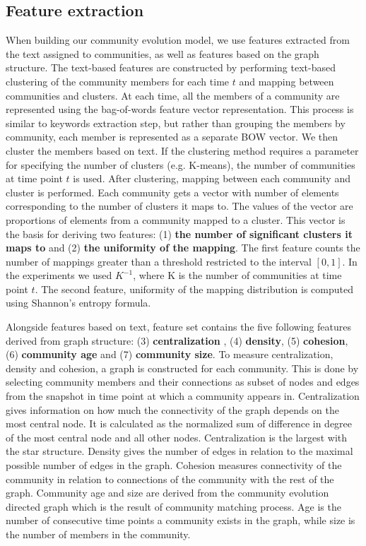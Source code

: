 \documentclass{article} %
\begin{document}
\subsection{Feature extraction}
When building our community evolution model, we use features extracted from the text assigned to communities, as well as features based on  the graph structure. The text-based features are constructed by performing text-based clustering of the community members for each time $t$ and mapping between communities and clusters. At each time,  all the members of a  community are represented using the bag-of-words feature vector representation. This process is similar to keywords extraction step, but rather than grouping the members by community, each member is represented as a separate BOW vector.  We then cluster the members based on text. If the clustering method requires a parameter for specifying the number of clusters (e.g. K-means), the number of communities at time point $t$ is used. After clustering, mapping between each community and cluster is performed. Each community gets a vector with number of elements corresponding to the number of clusters it maps to. The values of the vector are proportions of elements from a community mapped to a cluster. This vector is the basis for deriving two features: (1) {\bf the number of significant clusters it maps to} and (2) { \bf the uniformity of the mapping}. The first feature counts the number of mappings greater than a threshold restricted to the interval $[0, 1]$. In the experiments we used $K^{-1}$, where K is  the number of communities at time point $t$. The second feature, uniformity of the mapping distribution is computed using Shannon's entropy formula.

Alongside features based on text, feature set contains the five following features derived from graph structure: (3) {\bf centralization} \cite{freeman1978}, (4) {\bf density}\cite{wasserman1994}, (5) {\bf cohesion}, (6) {\bf community age} and (7) {\bf community size}. To measure centralization, density and cohesion, a graph is constructed for each community. This is done by selecting community members and their connections as subset of nodes and edges from the snapshot in time point at which a community appears in. Centralization gives information on how much the connectivity of the graph depends on the most central node. It is calculated as the normalized  sum of difference in degree of the most central node and all other nodes. Centralization is the largest with the star structure. Density gives the number of edges in relation to the maximal possible number of edges in the graph. Cohesion measures connectivity of the community in relation to connections of the community with the rest of the graph. Community age and size are derived from the community evolution directed graph which is the result of community matching process. Age is the number of consecutive time points a community exists in the graph, while size is the number of members in the community.
\end{document}
